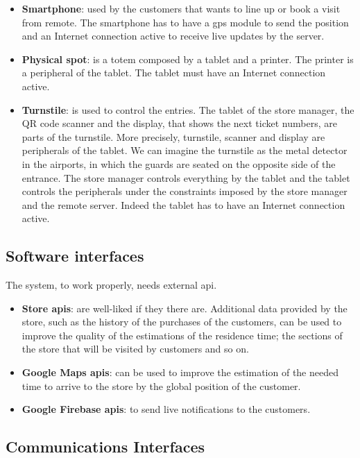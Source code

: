 \begin{itemize}
	\item \textbf{Smartphone}: used by the customers that wants to line up or book a visit from remote. The smartphone has to have a \gls{gps} module to send the position and an Internet connection active to receive live updates by the server.
	\item \textbf{Physical spot}: is a totem composed by a tablet and a printer. The printer is a peripheral of the tablet. The tablet must have an Internet connection active.
	\item \textbf{Turnstile}: is used to control the entries. The tablet of the store manager, the QR code scanner and the display, that shows the next ticket numbers, are parts of the turnstile. More precisely, turnstile, scanner and display are peripherals of the tablet.
	We can imagine the turnstile as the metal detector in the airports, in which the guards are seated on the opposite side of the entrance.
	The store manager controls everything by the tablet and the tablet controls the peripherals under the constraints imposed by the store manager and the remote server.
	Indeed the tablet has to have an Internet connection active.
\end{itemize}

\subsection{Software interfaces}

The system, to work properly, needs external \gls{api}.

\begin{itemize}
	\item \textbf{Store \glspl{api}}: are well-liked if they there are. Additional data provided by the store, such as the history of the purchases of the customers, can be used to improve the quality of the estimations of the residence time; the sections of the store that will be visited by customers and so on.
	\item \textbf{Google Maps \glspl{api}}: can be used to improve the estimation of the needed time to arrive to the store by the global position of the customer.
	\item \textbf{Google Firebase \glspl{api}}: to send live notifications to the customers.
\end{itemize}

\subsection{Communications Interfaces}

